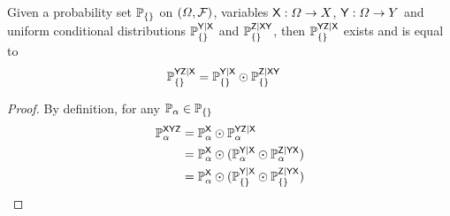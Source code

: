 \begin{lemma}\label{lem:joint_conditional}
Given a probability set $\mathbb{P}_{\{\}}$ on $(\Omega,\mathcal{F})$, variables $\mathsf{X}:\Omega\to X$, $\mathsf{Y}:\Omega\to Y$ and uniform conditional distributions $\mathbb{P}_{\{\}}^{\mathsf{Y}|\mathsf{X}}$ and $\mathbb{P}_{\{\}}^{\mathsf{Z}|\mathsf{XY}}$, then $\mathbb{P}_{\{\}}^{\mathsf{YZ}|\mathsf{X}}$ exists and is equal to
\begin{align}
	\mathbb{P}_{\{\}}^{\mathsf{YZ}|\mathsf{X}} &= \mathbb{P}_{\{\}}^{\mathsf{Y}|\mathsf{X}}\odot \mathbb{P}_{\{\}}^{\mathsf{Z}|\mathsf{XY}}
\end{align}
\end{lemma}

\begin{proof}
By definition, for any $\mathbb{P}_\alpha\in \mathbb{P}_{\{\}}$
\begin{align}
	\mathbb{P}_\alpha^{\mathsf{XYZ}} &= \mathbb{P}_\alpha^{\mathsf{X}}\odot \mathbb{P}_\alpha^{\mathsf{YZ}|\mathsf{X}}\\
							   &= \mathbb{P}_\alpha^{\mathsf{X}}\odot(\mathbb{P}_\alpha^{\mathsf{Y}|\mathsf{X}}\odot \mathbb{P}_\alpha^{\mathsf{Z}|\mathsf{YX}})\\
							   &= \mathbb{P}_\alpha^{\mathsf{X}}\odot(\mathbb{P}_{\{\}}^{\mathsf{Y}|\mathsf{X}}\odot \mathbb{P}_{\{\}}^{\mathsf{Z}|\mathsf{YX}})
\end{align}
\end{proof}







